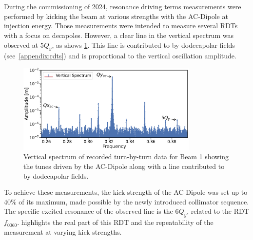 \section{}


During the commissioning of 2024, resonance driving terms measurements were performed by kicking the
beam at various strengths with the AC-Dipole at injection energy. Those measurements were intended
to measure several RDTs with a focus on decapoles.
However, a clear line in the vertical spectrum was observed at $5Q_y$, as shows
\cref{fig:high_orders:spectrum_dodecapole_5qy}. This line is contributed to by dodecapolar fields
(see \cref{appendix:rdts}) and is proportional to the vertical oscillation amplitude.

\begin{figure}[!htb]
    \centering
    \includegraphics[width=0.8\textwidth]{./images/spectrum_dodecapole_5qy.pdf}
    \caption{Vertical spectrum of recorded turn-by-turn data for Beam 1 showing the tunes driven by the
    AC-Dipole along with a line contributed to by dodecapolar fields.}
    \label{fig:high_orders:spectrum_dodecapole_5qy}
\end{figure}

To achieve these measurements, the kick strength of the AC-Dipole was set up to $40\%$ of its
maximum, made possible by the newly introduced collimator sequence. The specific excited resonance
of the observed line is the $6Q_y$, related to the RDT $f_{0060}$.
 highlights the real part of this RDT and the repeatability
of the measurement at varying kick strengths.

